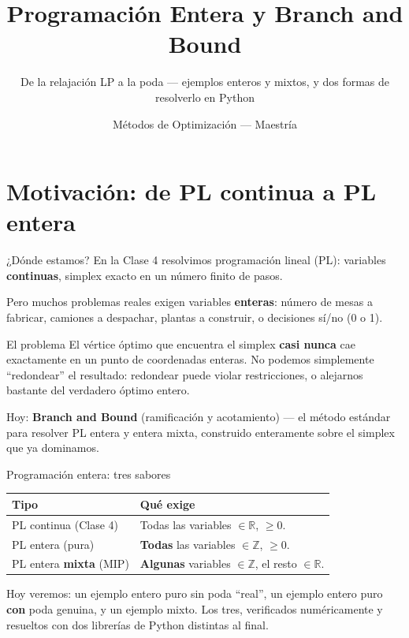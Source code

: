 \documentclass[aspectratio=169]{beamer}
\title{Programación Entera y Branch and Bound}
\subtitle{De la relajación LP a la poda --- ejemplos enteros y mixtos, y dos formas de resolverlo en Python}
\author{Métodos de Optimización --- Maestría}
\institute{Universidad Pontificia Bolivariana}
\date{}
\begin{document}
\maketitle

\section{Motivación: de PL continua a PL entera}

\begin{frame}{¿Dónde estamos?}
En la Clase 4 resolvimos programación lineal (PL): variables \textbf{continuas}, simplex exacto en un número finito de pasos.

\vspace{0.3cm}
Pero muchos problemas reales exigen variables \textbf{enteras}: número de mesas a fabricar, camiones a despachar, plantas a construir, o decisiones sí/no (0 o 1).

\begin{alertblock}{El problema}
El vértice óptimo que encuentra el simplex \textbf{casi nunca} cae exactamente en un punto de coordenadas enteras. No podemos simplemente ``redondear'' el resultado: redondear puede violar restricciones, o alejarnos bastante del verdadero óptimo entero.
\end{alertblock}

\vspace{0.2cm}
Hoy: \textbf{Branch and Bound} (ramificación y acotamiento) --- el método estándar para resolver PL entera y entera mixta, construido enteramente sobre el simplex que ya dominamos.
\end{frame}

\begin{frame}{Programación entera: tres sabores}
\begin{center}
\renewcommand{\arraystretch}{1.4}
\begin{tabular}{@{}p{3.6cm}p{8.6cm}@{}}
\toprule
\textbf{Tipo} & \textbf{Qué exige}\\
\midrule
PL continua (Clase 4) & Todas las variables $\in\mathbb{R}$, $\geq0$.\\
PL entera (pura) & \textbf{Todas} las variables $\in\mathbb{Z}$, $\geq0$.\\
PL entera \textbf{mixta} (MIP) & \textbf{Algunas} variables $\in\mathbb{Z}$, el resto $\in\mathbb{R}$.\\
\bottomrule
\end{tabular}
\end{center}

\vspace{0.3cm}
Hoy veremos: un ejemplo entero puro sin poda ``real'', un ejemplo entero puro \textbf{con} poda genuina, y un ejemplo mixto. Los tres, verificados numéricamente y resueltos con dos librerías de Python distintas al final.
\end{frame}
\end{document}
